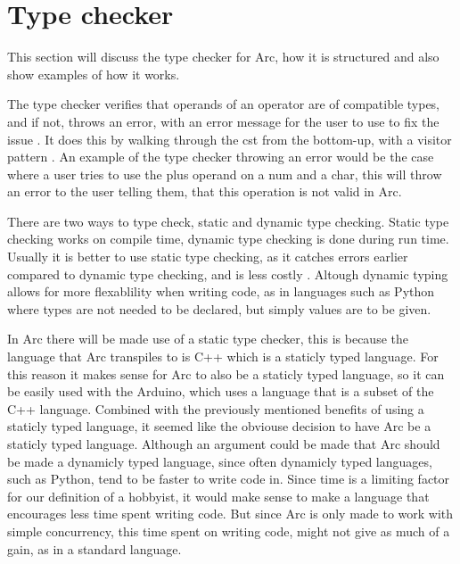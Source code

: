 \section{Type checker}
This section will discuss the type checker for Arc, how it is structured and also show examples of how it works.

The type checker verifies that operands of an operator are of compatible types, and if not, throws an error, with an error message for the user to use to fix the issue \cite{Sebesta2016}. It does this by walking through the \gls{cst} from the bottom-up, with a visitor pattern \cite{Parr2014}. An example of the type checker throwing an error would be the case where a user tries to use the plus operand on a num and a char, this will throw an error to the user telling them, that this operation is not valid in Arc.

There are two ways to type check, static and dynamic type checking. Static type checking works on compile time, dynamic type checking is done during run time. Usually it is better to use static type checking, as it catches errors earlier compared to dynamic type checking, and is less costly \cite{Sebesta2016}. Altough dynamic typing allows for more flexablility when writing code, as in languages such as Python where types are not needed to be declared, but simply values are to be given.

In Arc there will be made use of a static type checker, this is because the language that Arc transpiles to is C++ which is a staticly typed language. For this reason it makes sense for Arc to also be a staticly typed language, so it can be easily used with the Arduino, which uses a language that is a subset of the C++ language.  Combined with the previously mentioned benefits of using a staticly typed language, it seemed like the obviouse decision to have Arc be a staticly typed language. Although an argument could be made that Arc should be made a dynamicly typed language, since often dynamicly typed languages, such as Python, tend to be faster to write code in. Since time is a limiting factor for our definition of a hobbyist, it would make sense to make a language that encourages less time spent writing code. But since Arc is only made to work with simple concurrency, this time spent on writing code, might not give as much of a gain, as in a standard language. 


